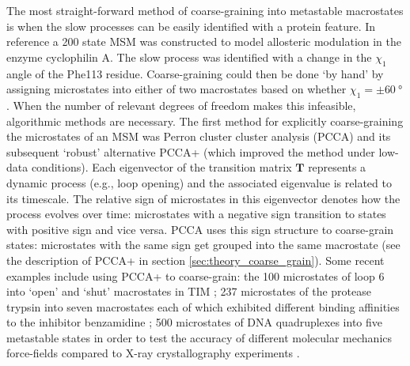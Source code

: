 The most straight-forward method of coarse-graining into metastable macrostates is when the slow processes can be easily identified with a protein feature.  In reference \cite{wapeesittipanAllostericEffectsCyclophilin2019} a 200 state MSM was constructed to model allosteric modulation in the enzyme cyclophilin A.  The slow process was identified with a change in the $\chi_{1}$ angle of the Phe113 residue.  Coarse-graining could then be done `by hand' by assigning microstates into either of two macrostates based on whether $\chi_{1} = \pm\SI{60}{\degree}$.  When the  number of relevant degrees of freedom makes this infeasible, algorithmic methods are necessary. The first method for explicitly coarse-graining the microstates of an MSM was Perron cluster cluster analysis (PCCA) \cite{deuflhardIdentificationAlmostInvariant2000a} and its subsequent `robust' alternative PCCA+ \cite{deuflhardRobustPerronCluster2005b} (which improved the method under low-data conditions).  Each eigenvector of the transition matrix $\mathbf{T}$ represents a dynamic process (e.g., loop opening) and the associated eigenvalue is related to its timescale.  The relative sign of microstates in this eigenvector denotes how the process evolves over time: microstates with a negative sign transition to states with positive sign and vice versa. PCCA uses this sign structure to coarse-grain states: microstates with the same sign get grouped into the same macrostate (see the description of PCCA+ in section \ref{sec:theory_coarse_grain}).  Some recent examples include using PCCA+ to coarse-grain: the 100 microstates of loop 6 into `open' and `shut' macrostates in TIM \cite{LoopMotionTriosephosphate}; 237 microstates of the protease trypsin into seven macrostates each of which exhibited different binding affinities  to the inhibitor benzamidine \cite{plattnerProteinConformationalPlasticity2015}; 500 microstates of DNA quadruplexes into five metastable states in order to test the accuracy of different molecular mechanics force-fields compared to X-ray crystallography experiments \cite{islamExploringDynamicsPropeller2017}.  


